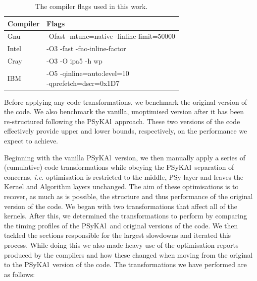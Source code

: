 \documentclass{IOS-Book-Article}
\newcommand{\psykal}{{PS}y{KA}l}
\begin{document}
\begin{table}[!t]
\renewcommand{\arraystretch}{1.3}
\caption{The compiler flags used in this work.}
\label{TABLE_compiler_flags}
\centering
\begin{tabular}{l|l}
\hline
Compiler  &  Flags \\
\hline
Gnu       & -Ofast -mtune=native -finline-limit=50000    \\
Intel     & -O3 -fast -fno-inline-factor    \\
Cray      & -O3 -O ipa5 -h wp               \\
IBM       & \parbox{5cm}{-O5 -qinline=auto:level=10\\ -qprefetch=dscr=0x1D7} \\
\hline
\end{tabular}
\end{table}

Before applying any code transformations, we benchmark the original
version of the code. We also benchmark the vanilla, unoptimised
version after it has been re-structured following the \psykal\
approach. These two versions of the code effectively provide upper and
lower bounds, respectively, on the performance we expect to achieve.

Beginning with the vanilla \psykal\ version, we then manually apply a
series of (cumulative) code transformations while obeying the \psykal\ 
separation of concerns, {\it i.e.} optimisation is restricted to the
middle, {PS}y layer and leaves the Kernel and Algorithm layers
unchanged. The aim of these optimisations is to recover, as much as is
possible, the structure and thus performance of the original version
of the code. We began with two transformations that affect all of the
kernels. After this, we determined the transformations to perform by
comparing the timing profiles of the \psykal\ and original versions of
the code. We then tackled the sections responsible for the largest
slowdowns and iterated this process. While doing this we also made
heavy use of the optimisation reports produced by the compilers and
how these changed when moving from the original to the \psykal\ version
of the code. The transformations we have performed are as follows:

\newcounter{tnum}
\end{document}

